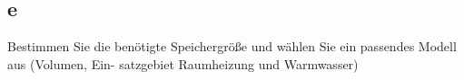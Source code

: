 \subsection{e}
Bestimmen Sie die benötigte Speichergröße und wählen Sie ein passendes Modell aus (Volumen, Ein-
satzgebiet Raumheizung und Warmwasser)